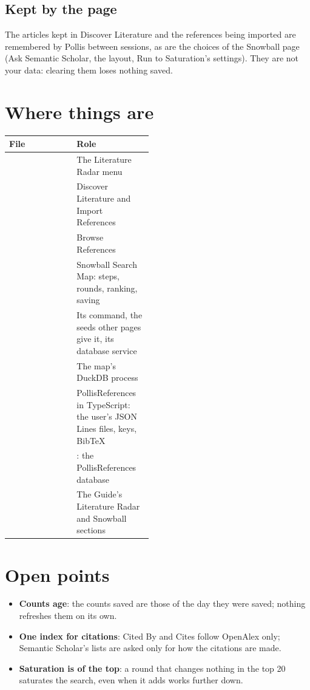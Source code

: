 \subsection{Kept by the page}
The articles kept in Discover Literature and the references being imported are remembered by Pollis between sessions, as
are the choices of the Snowball page (Ask Semantic Scholar, the layout, Run to Saturation's settings). They are not your
data: clearing them loses nothing saved.

\section{Where things are}\label{sec:where}

\begin{center}\small
\renewcommand{\arraystretch}{1.2}
\begin{tabularx}{\linewidth}{@{}p{0.47\linewidth}L@{}}
\toprule
\textbf{File} & \textbf{Role}\\
\midrule
{} & The Literature Radar menu\\
 & Discover Literature and Import References\\
 & Browse References\\
 & Snowball Search Map: steps, rounds, ranking, saving\\
 & Its command, the seeds other pages give it, its database service\\
 & The map's DuckDB process\\
 & PollisReferences in TypeScript: the user's JSON Lines files, keys, BibTeX\\
 & : the PollisReferences database\\
 & The Guide's Literature Radar and Snowball sections\\
\bottomrule
\end{tabularx}
\end{center}

\section{Open points}\label{sec:open}
\begin{itemize}
  \item \textbf{Counts age}: the counts saved are those of the day they were saved; nothing refreshes them on its own.
  \item \textbf{One index for citations}: Cited By and Cites follow OpenAlex only; Semantic Scholar's lists are asked only
    for how the citations are made.
  \item \textbf{Saturation is of the top}: a round that changes nothing in the top 20 saturates the search, even when it
    adds works further down.
\end{itemize}

